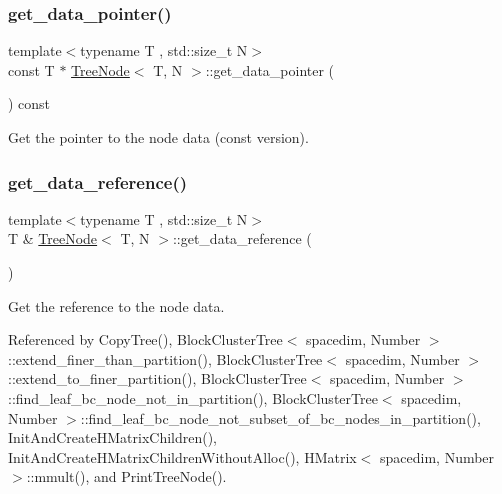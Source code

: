 \subsubsection{\texorpdfstring{get\+\_\+data\+\_\+pointer()}{get\_data\_pointer()}\hspace{0.1cm}{\footnotesize\ttfamily [2/2]}}
{\footnotesize\ttfamily template$<$typename T , std\+::size\+\_\+t N$>$ \\
const T $\ast$ \hyperlink{classTreeNode}{Tree\+Node}$<$ T, N $>$\+::get\+\_\+data\+\_\+pointer (\begin{DoxyParamCaption}{ }\end{DoxyParamCaption}) const}

Get the pointer to the node data (const version). \mbox{\label{classTreeNode_a7bf414928c965e707e0246f7a90a747d}} 
\subsubsection{\texorpdfstring{get\+\_\+data\+\_\+reference()}{get\_data\_reference()}\hspace{0.1cm}{\footnotesize\ttfamily [1/2]}}
{\footnotesize\ttfamily template$<$typename T , std\+::size\+\_\+t N$>$ \\
T \& \hyperlink{classTreeNode}{Tree\+Node}$<$ T, N $>$\+::get\+\_\+data\+\_\+reference (\begin{DoxyParamCaption}{ }\end{DoxyParamCaption})}

Get the reference to the node data. 

Referenced by Copy\+Tree(), Block\+Cluster\+Tree$<$ spacedim, Number $>$\+::extend\+\_\+finer\+\_\+than\+\_\+partition(), Block\+Cluster\+Tree$<$ spacedim, Number $>$\+::extend\+\_\+to\+\_\+finer\+\_\+partition(), Block\+Cluster\+Tree$<$ spacedim, Number $>$\+::find\+\_\+leaf\+\_\+bc\+\_\+node\+\_\+not\+\_\+in\+\_\+partition(), Block\+Cluster\+Tree$<$ spacedim, Number $>$\+::find\+\_\+leaf\+\_\+bc\+\_\+node\+\_\+not\+\_\+subset\+\_\+of\+\_\+bc\+\_\+nodes\+\_\+in\+\_\+partition(), Init\+And\+Create\+H\+Matrix\+Children(), Init\+And\+Create\+H\+Matrix\+Children\+Without\+Alloc(), H\+Matrix$<$ spacedim, Number $>$\+::mmult(), and Print\+Tree\+Node().

\mbox{\label{classTreeNode_ab051909179e64f75d4588b4618049193}} 
